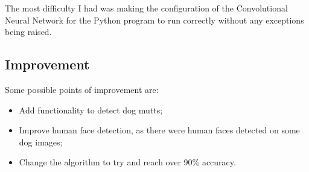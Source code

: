 \documentclass{article}
\begin{document}
    The most difficulty I had was making the configuration of the Convolutional Neural Network for the Python program to run correctly without any exceptions being raised.

    \subsection{Improvement}

    Some possible points of improvement are:

    \begin{itemize}
        \item Add functionality to detect dog mutts;
        \item Improve human face detection, as there were human faces detected on some dog images;
        \item Change the algorithm to try and reach over 90\% accuracy.
    \end{itemize}
\end{document}

